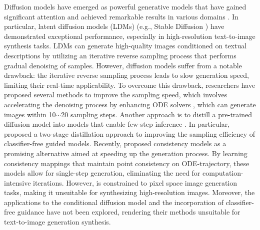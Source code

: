 \documentclass{article} %
\begin{document}
Diffusion models have emerged as powerful generative models that have gained significant attention and achieved remarkable results in various domains \citep{ho2020denoising,song2020denoising,nichol2021improved,ramesh2022hierarchical, song2019generative, song2021maximum}. In particular, latent diffusion models (LDMs) (e.g., Stable Diffusion \citep{rombach2022high}) have demonstrated exceptional performance, especially in high-resolution text-to-image synthesis tasks. LDMs can generate high-quality images conditioned on textual descriptions by utilizing an iterative reverse sampling process that performs gradual denoising of samples. However, diffusion models suffer from a notable drawback: the iterative reverse sampling process leads to slow generation speed, limiting their real-time applicability. To overcome this drawback, researchers have proposed several methods to improve the sampling speed, which involves accelerating the denoising process by enhancing ODE solvers \citep{ho2020denoising,lu2022dpm,lu2022dpm++}, which can generate images within 10$\sim$20 sampling steps. Another approach is to distill a pre-trained diffusion model into models that enable few-step inference \cite{salimans2022progressive,meng2023distillation}. In particular, \cite{meng2023distillation} proposed a two-stage distillation approach to improving the sampling efficiency of classifier-free guided models.
Recently, \cite{song2023consistency} proposed consistency models as a promising alternative aimed at speeding up the generation process. By learning consistency mappings that maintain point consistency on ODE-trajectory, these models allow for single-step generation, eliminating the need for computation-intensive iterations. However, \cite{song2023consistency} is constrained to pixel space image generation tasks, making it unsuitable for synthesizing high-resolution images. Moreover, the applications to the conditional diffusion model and the incorporation of classifier-free guidance have not been explored, rendering their methods unsuitable for text-to-image generation synthesis. 

\end{document}
